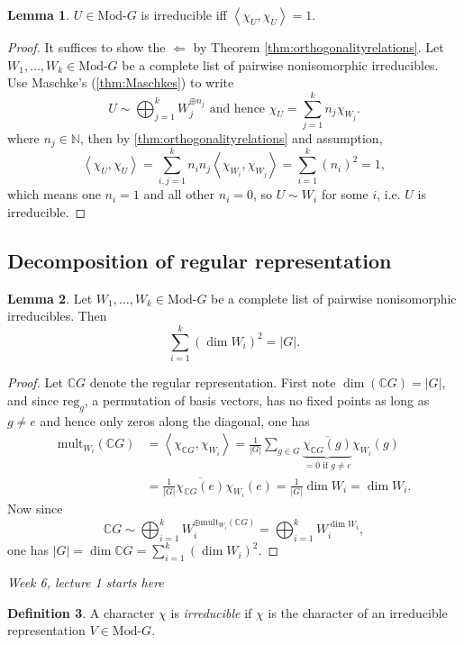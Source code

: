 \documentclass{article}
\newcommand{\mult}{\text{mult}}
\newcommand{\la}{\left\langle}
\newcommand{\ra}{\right\rangle}
\newcommand{\N}{\mathbb{N}}
\newcommand{\C}{\mathbb{C}}
\newcommand{\reg}{\text{reg}}
\newcommand{\Mod}{\text{Mod-}}
\theoremstyle{definition}
\newtheorem{defn}{Definition}[subsection]
\newtheorem{lemma}[defn]{Lemma}
\begin{document}
\begin{lemma}
\label{lemma:irrediffinnerprod1}
$U\in\Mod G$ is irreducible iff $\la\chi_U,\chi_U\ra=1$.
\end{lemma}
\begin{proof}
It suffices to show the $\Leftarrow$ by Theorem \ref{thm:orthogonalityrelations}. Let $W_1,\ldots,W_k\in\Mod G$ be a complete list of pairwise nonisomorphic irreducibles. Use Maschke's (\ref{thm:Maschkes}) to write
\[
U\sim\bigoplus_{j=1}^k W_j^{\oplus n_j}\text{ and hence }\chi_U=\sum_{j=1}^k n_j\chi_{W_j}.
\]
where $n_j\in\N$, then by \ref{thm:orthogonalityrelations} and assumption,
\[
\la\chi_U,\chi_U\ra=\sum_{i,j=1}^k n_in_j\la\chi_{W_i},\chi_{W_j}\ra=\sum_{i=1}^k (n_i)^2=1,
\] 
which means one $n_i=1$ and all other $n_i=0$, so $U\sim W_i$ for some $i$, i.e. $U$ is irreducible.
\end{proof}

\subsection{Decomposition of regular representation}
\begin{lemma}
\label{lemma:sumirreddimsqisordG}
Let $W_1,\ldots,W_k\in\Mod G$ be a complete list of pairwise nonisomorphic irreducibles. Then
\[
\sum_{i=1}^k(\dim W_i)^2=|G|.
\]
\end{lemma}
\begin{proof}
Let $\C G$ denote the regular representation. First note $\dim (\C G)=|G|$, and since $\reg_g$, a permutation of basis vectors, has no fixed points as long as $g\neq e$ and hence only zeros along the diagonal, one has
\[
\begin{aligned}
\mult_{W_i}(\C G)&=\la \chi_{\C G},\chi_{W_i}\ra=\frac{1}{|G|}\sum_{g\in G}\underbrace{\overline{\chi_{\C G}(g)}}_{=0\text{ if }g\neq e}\chi_{W_i}(g)\\
&=\frac{1}{|G|}\overline{\chi_{\C G}(e)}\chi_{W_i}(e)=\frac{1}{|G|}\dim W_i=\dim W_i.
\end{aligned}
\]
Now since
\[
\C G\sim\bigoplus_{i=1}^k W_i^{\oplus \mult_{W_i}(\C G)}=\bigoplus_{i=1}^k W_i^{\dim W_i},
\]
one has $|G|=\dim\C G=\sum_{i=1}^k(\dim W_i)^2$.
\end{proof}

\begin{flushright}
\textit{Week 6, lecture 1 starts here}
\end{flushright}

\begin{defn}
A character $\chi$ is \textit{irreducible} if $\chi$ is the character of an irreducible representation $V\in\Mod G$.
\end{defn}
\end{document}
